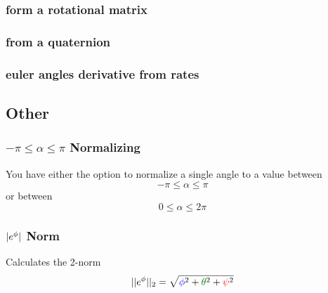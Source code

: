 \subsubsection*{form a rotational matrix}


\subsubsection*{from a quaternion}


\subsubsection*{euler angles derivative from rates}




\subsection{Other}
\subsubsection*{$-\pi \leq \alpha \leq \pi$ Normalizing}
You have either the option to normalize a single angle to a value between
\begin{equation}
-\pi \leq \alpha \leq \pi
\end{equation}
or between 
\begin{equation}
0 \leq \alpha \leq 2\pi
\end{equation}

\subsubsection*{$\norm{\eu{e}} $ Norm}
Calculates the 2-norm
\begin{equation}
\norm{\norm{\eu{e}}}_2 = \sqrt{\Roll^2+\Pitch^2+\Yaw^2}
\end{equation}

